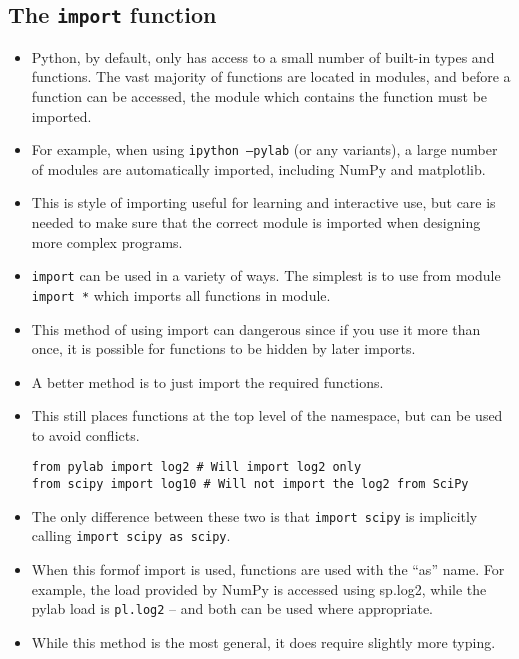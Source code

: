 \documentclass[KSmain.tex]{subfiles}
\begin{document}
\subsection{The \texttt{import} function}
\begin{itemize}
\item Python, by default, only has access to a small number of built-in types and functions. The vast majority of
functions are located in modules, and before a function can be accessed, the module which contains the
function must be imported. 

\item For example, when using \texttt{ipython --pylab} (or any variants), a large number
of modules are automatically imported, including NumPy and matplotlib.
\item This is style of importing useful
for learning and interactive use, but care is needed to make sure that the correct module is imported when
designing more complex programs.

\item \texttt{import} can be used in a variety of ways. The simplest is to use from module \texttt{import *} which imports
all functions in module. 
\item This method of using import can dangerous since if you use it more than once,
it is possible for functions to be hidden by later imports. 
\item A better method is to just import the required
functions. 
\item This still places functions at the top level of the namespace, but can be used to avoid conflicts.
\begin{framed}
\begin{verbatim}
from pylab import log2 # Will import log2 only
from scipy import log10 # Will not import the log2 from SciPy
\end{verbatim}
\end{framed}
\item The only difference between these two is that \texttt{import scipy} is implicitly calling \texttt{import scipy as scipy}.
\item When this formof import is used, functions are used with the “as” name. For example, the load provided
by NumPy is accessed using sp.log2, while the pylab load is \texttt{pl.log2} – and both can be used where appropriate.
\item While this method is the most general, it does require slightly more typing.
\end{itemize}
\end{document}
